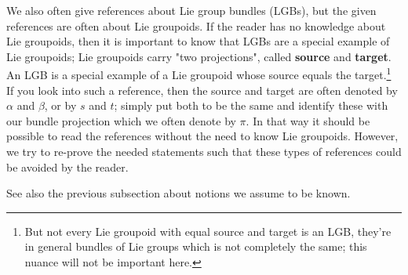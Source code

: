 \documentclass[a4paper,oneside,11pt,bibliography=totoc]{scrartcl}
\theoremstyle{plain}
\theoremstyle{remark}
\theoremstyle{definition}
\begin{document}
We also often give references about Lie group bundles (LGBs), but the given references are often about Lie groupoids. If the reader has no knowledge about Lie groupoids, then it is important to know that LGBs are a special example of Lie groupoids; Lie groupoids carry "two projections", called \textbf{source} and \textbf{target}. An LGB is a special example of a Lie groupoid whose source equals the target.\footnote{But not every Lie groupoid with equal source and target is an LGB, they're in general bundles of Lie groups which is not completely the same; this nuance will not be important here.} If you look into such a reference, then the source and target are often denoted by $\alpha$ and $\beta$, or by $s$ and $t$; simply put both to be the same and identify these with our bundle projection which we often denote by $\pi$. In that way it should be possible to read the references without the need to know Lie groupoids. However, we try to re-prove the needed statements such that these types of references could be avoided by the reader.

See also the previous subsection about notions we assume to be known.

\end{document}

